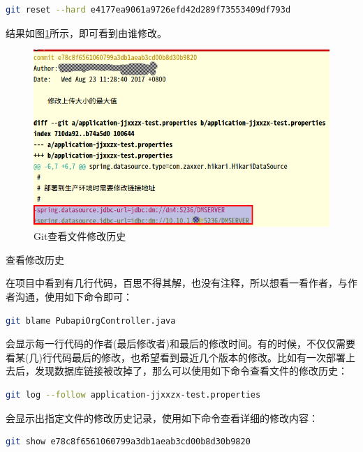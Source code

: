 \documentclass[11pt,fleqn]{book}
\makeatletter
\numberwithin{dummy}{section}
\theoremstyle{ocrenumbox}
\theoremstyle{blacknumex}
\theoremstyle{blacknumbox}
\theoremstyle{ocrenum}
\renewcommand{\subsection}{\@startsection {subsection}{2}{\z@}
	{-3ex \@plus -0.1ex \@minus -.4ex}
	{0.5ex \@plus.2ex }
	{\normalfont\sffamily\bfseries}}
\makeatother
\begin{document}
\begin{lstlisting}[language=Bash]
git reset --hard e4177ea9061a9726efd42d289f73553409df793d
\end{lstlisting}

结果如图\ref{fig:filemodifyhistory}所示，即可看到由谁修改。

\begin{figure}[htbp]
	\centering
	\includegraphics[scale=0.4]{filemodifyhistory.png}
	\caption{Git查看文件修改历史}
	\label{fig:filemodifyhistory}
\end{figure}


\subsection{查看修改历史}

在项目中看到有几行代码，百思不得其解，也没有注释，所以想看一看作者，与作者沟通，使用如下命令即可：

\begin{lstlisting}[language=Bash]
git blame PubapiOrgController.java
\end{lstlisting}

会显示每一行代码的作者(最后修改者)和最后的修改时间。有的时候，不仅仅需要看某(几)行代码最后的修改，也希望看到最近几个版本的修改。比如有一次部署上去后，发现数据库链接被改掉了，那么可以使用如下命令查看文件的修改历史：

\begin{lstlisting}[language=Bash]
git log --follow application-jjxxzx-test.properties
\end{lstlisting}

会显示出指定文件的修改历史记录，使用如下命令查看详细的修改内容：

\begin{lstlisting}[language=Bash]
git show e78c8f6561060799a3db1aeab3cd00b8d30b9820
\end{lstlisting}
\end{document}
